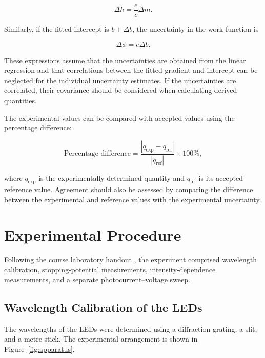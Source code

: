 \documentclass[12pt,a4paper]{article}
\begin{document}
\begin{equation}
    \Delta h = \frac{e}{c}\Delta m.
    \label{eq:uncertainty_h}
\end{equation}

Similarly, if the fitted intercept is \(b\pm\Delta b\), the uncertainty in the work function is

\begin{equation}
    \Delta\phi = e\Delta b.
    \label{eq:uncertainty_phi}
\end{equation}

These expressions assume that the uncertainties are obtained from the linear regression and that correlations between the fitted gradient and intercept can be neglected for the individual uncertainty estimates. If the uncertainties are correlated, their covariance should be considered when calculating derived quantities.

The experimental values can be compared with accepted values using the percentage difference:

\begin{equation}
    \text{Percentage difference}
    = \frac{|q_{\mathrm{exp}}-q_{\mathrm{ref}}|}
    {|q_{\mathrm{ref}}|}\times100\%,
    \label{eq:percentage_difference}
\end{equation}

where \(q_{\mathrm{exp}}\) is the experimentally determined quantity and \(q_{\mathrm{ref}}\) is its accepted reference value. Agreement should also be assessed by comparing the difference between the experimental and reference values with the experimental uncertainty.

\newpage

\section{Experimental Procedure}

Following the course laboratory handout \cite{py2107}, the experiment comprised wavelength calibration, stopping-potential measurements, intensity-dependence measurements, and a separate photocurrent--voltage sweep.

\subsection{Wavelength Calibration of the LEDs}

The wavelengths of the LEDs were determined using a diffraction grating, a slit, and a metre stick. The experimental arrangement is shown in Figure~\ref{fig:apparatus}.
\end{document}
